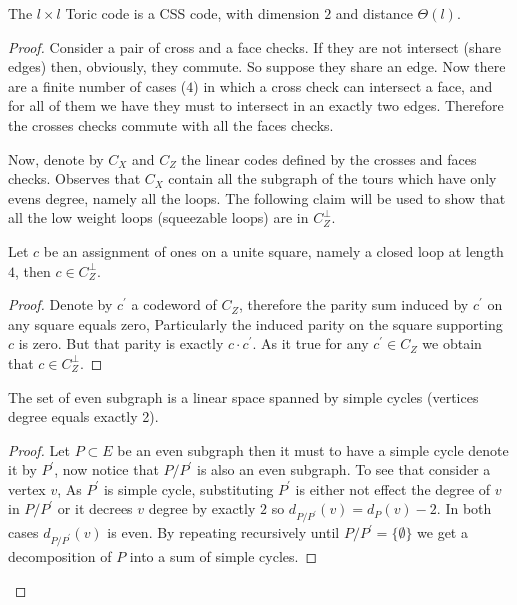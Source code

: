 \begin{claim}
  The $l \times l$  Toric code is a CSS code, with dimension $2$ and distance $\Theta\left( l \right)$.   
\end{claim}
\begin{proof}
  Consider a pair of cross and a face checks. If they are not intersect (share edges) then, obviously, they commute. So suppose they share an edge. Now there are a finite number of cases ($4$) in which a cross check can intersect a face, and for all of them we have they must to intersect in an exactly two edges. Therefore the crosses checks commute with all the faces checks. 

  Now, denote by $C_{X}$ and $C_{Z}$ the linear codes defined by the crosses and faces checks. Observes that $C_{X}$ contain all the subgraph of the tours which have only evens degree, namely all the loops. The following claim will be used to show that all the low weight loops (squeezable loops) are in $C_{Z}^{\perp}$. 
  \begin{claim} \label{claim:square}
    Let $c$ be an assignment of ones on a unite square, namely a closed loop at length $4$, then $c \in C_{Z}^{\perp}$.  
  \end{claim}
  \begin{proof}
    Denote by $c^{\prime}$ a codeword of $C_{Z}$, therefore the parity sum induced by $c^{\prime}$ on any square equals zero, Particularly the induced parity on the square supporting $c$ is zero. But that parity is exactly $c\cdot c^{\prime}$. As it true for any $c^{\prime} \in C_{Z}$ we obtain that $c \in C_{Z}^{\perp}$.  
  \end{proof}
  \begin{claim} \label{claim:velen}
    The set of even subgraph is a linear space spanned by simple cycles (vertices degree equals exactly 2).
  \end{claim}
  \begin{proof}
    Let $P \subset E$ be an even subgraph then it must to have a simple cycle denote it by $P^{\prime}$, now notice that $P/P^\prime$ is also an even subgraph. To see that consider a vertex $v$, As $P^{\prime}$ is simple cycle, substituting $P^{\prime}$ is either not effect the degree of $v$ in $P/P^{\prime}$ or it decrees $v$ degree by exactly $2$ so $d_{P/P^{\prime}}\left( v \right) = d_{P}\left( v \right) - 2$. In both cases $d_{P/P^{\prime}}\left( v \right)$ is even.
    By repeating recursively until $P/P^{\prime} = \{ \emptyset \}$ we get a decomposition of $P$ into a sum of simple cycles.   
  \end{proof}


\end{proof}
